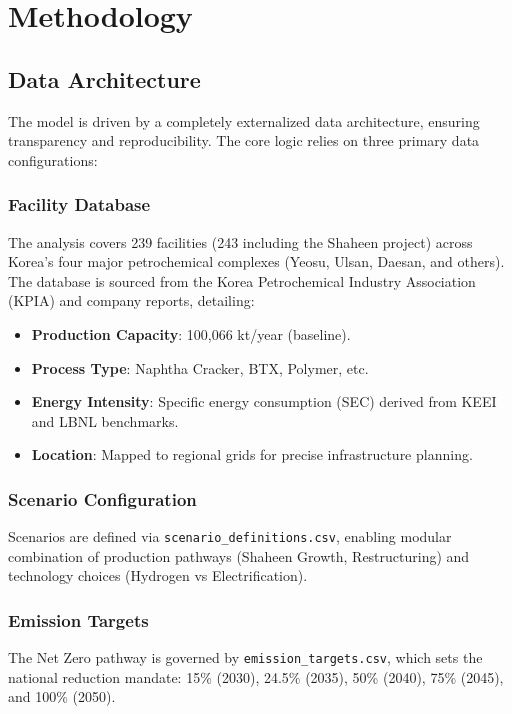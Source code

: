 \documentclass[12pt,a4paper]{article}
\begin{document}
\section{Methodology}

\subsection{Data Architecture}

The model is driven by a completely externalized data architecture, ensuring transparency and reproducibility. The core logic relies on three primary data configurations:

\subsubsection{Facility Database}
The analysis covers 239 facilities (243 including the Shaheen project) across Korea's four major petrochemical complexes (Yeosu, Ulsan, Daesan, and others). The database is sourced from the Korea Petrochemical Industry Association (KPIA) and company reports, detailing:
\begin{itemize}
    \item \textbf{Production Capacity}: 100,066 kt/year (baseline).
    \item \textbf{Process Type}: Naphtha Cracker, BTX, Polymer, etc.
    \item \textbf{Energy Intensity}: Specific energy consumption (SEC) derived from KEEI and LBNL benchmarks.
    \item \textbf{Location}: Mapped to regional grids for precise infrastructure planning.
\end{itemize}

\subsubsection{Scenario Configuration}
Scenarios are defined via \texttt{scenario\_definitions.csv}, enabling modular combination of production pathways (Shaheen Growth, Restructuring) and technology choices (Hydrogen vs Electrification).

\subsubsection{Emission Targets}
The Net Zero pathway is governed by \texttt{emission\_targets.csv}, which sets the national reduction mandate: 15\% (2030), 24.5\% (2035), 50\% (2040), 75\% (2045), and 100\% (2050).
\end{document}
